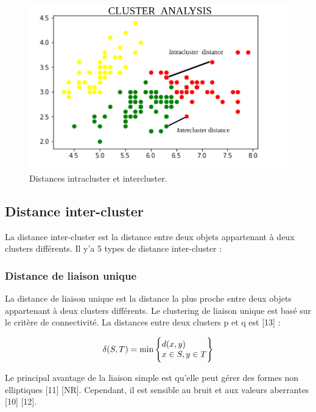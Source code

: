\begin{figure}[H]
	\begin{center}
		\includegraphics[width=\textwidth]{images/chapitre6/inter-intra_clusters__distnce.png}
	\end{center}
\caption{Distances intracluster et intercluster.}
\label{inter_intra_clusters}
\end{figure}

\subsection{Distance inter-cluster}
La distance inter-cluster est la distance entre deux objets appartenant à deux clusters différents. Il y’a 5 types de distance inter-cluster :

\subsubsection{Distance de liaison unique}
La distance de liaison unique est la distance la plus proche entre deux objets appartenant à deux clusters différents. Le clustering de liaison unique est basé sur le critère de connectivité. La distances entre deux clusters p et q est [13] :

 
\begin{equation}
     \delta (S,T) = \min  \Bigg\{
\begin{tabular}{@{}l@{}}
    \(\displaystyle d(x,y) \)  \\
    \(\displaystyle x \in S,y \in T \) 
\end{tabular} \Bigg\}
\end{equation}

Le principal avantage de la liaison simple est qu'elle peut gérer des formes non elliptiques [11] [NR]. Cependant, il est sensible au bruit et aux valeurs aberrantes [10] [12].

